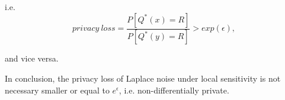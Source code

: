 \documentclass{article}
\begin{document}
i.e.
\begin{equation*}
privacy\ loss = \frac{P[Q^{*}(x) = R]}{P[Q^{*}(y) = R]} > exp(\epsilon),
\end{equation*}


and vice versa.





In conclusion, the privacy loss of Laplace noise under local sensitivity is not necessary smaller or equal to $e^{\epsilon}$, i.e. non-differentially private.
\end{document}
